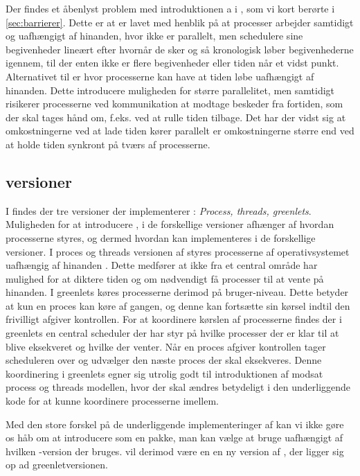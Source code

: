 Der findes et åbenlyst problem med introduktionen a \des i \csp, som vi kort berørte i \cref{sec:barrierer}. Dette er at \csp er lavet med henblik på at processer arbejder samtidigt og uafhængigt af hinanden, hvor \des  ikke er parallelt, men schedulere sine begivenheder lineært efter hvornår de sker og så kronologisk løber begivenhederne igennem, til der enten ikke er flere begivenheder eller tiden når et vidst punkt. Alternativet til  \des  er \pdes hvor processerne kan have at tiden løbe uafhængigt af hinanden. Dette introducere muligheden for større parallelitet, men samtidigt risikerer processerne ved kommunikation at modtage beskeder fra fortiden, som der skal tages hånd om, f.eks. ved at rulle tiden tilbage. Det har der vidst sig at omkostningerne ved at lade tiden kører parallelt er omkostningerne større end ved at holde tiden synkront på tværs af processerne.
    
\subsection{\pycsp versioner}I \pycsp findes der tre versioner der implementerer \csp: \emph{Process, threads, greenlets}\cite{Friborg2009}. Muligheden for at introducere \des, i de forskellige versioner afhænger af hvordan processerne styres, og dermed hvordan \des kan  implementeres i de forskellige versioner. I proces og threads versionen af \pycsp styres processerne af operativsystemet uafhængig af hinanden . Dette medfører at \pycsp ikke fra et central område har mulighed for at diktere tiden og om nødvendigt få processer til at vente på hinanden. I greenlets køres processerne derimod på bruger-niveau. Dette betyder at kun en proces kan køre af gangen, og denne kan fortsætte sin kørsel indtil den frivilligt afgiver kontrollen. For at koordinere kørslen af processerne findes der i greenlets en central scheduler der har styr på hvilke processer der er klar til at blive eksekveret og hvilke der venter. Når en proces afgiver kontrollen tager scheduleren over og udvælger den næste proces der skal eksekveres. Denne koordinering i greenlets  egner sig utrolig godt til introduktionen af \des modsat process og threads modellen, hvor der skal ændres betydeligt i den underliggende kode for at kunne koordinere processerne imellem. 

Med den store forskel på de underliggende implementeringer af \csp kan vi ikke gøre os håb om at introducere \des som en pakke, man kan vælge at bruge uafhængigt af hvilken \pycsp-version  der bruges. \Des vil derimod være en en ny version af \pycsp, der ligger sig op ad greenletversionen. 

